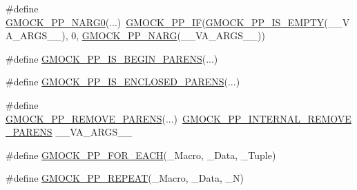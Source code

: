 \begin{DoxyCompactItemize}
\item 
\#define \mbox{\hyperlink{_obj__test_2lib_2googletest-master_2googlemock_2include_2gmock_2internal_2gmock-pp_8h_a0f49faf3c63534a722e2f320ff8d4cd0}{G\+M\+O\+C\+K\+\_\+\+P\+P\+\_\+\+N\+A\+R\+G0}}(...)~\mbox{\hyperlink{_obj__test_2lib_2googletest-master_2googlemock_2include_2gmock_2internal_2gmock-pp_8h_a82f153fedbaf56bf71b8272bdf672875}{G\+M\+O\+C\+K\+\_\+\+P\+P\+\_\+\+IF}}(\mbox{\hyperlink{_obj__test_2lib_2googletest-master_2googlemock_2include_2gmock_2internal_2gmock-pp_8h_a14eb10c5cc7380d072cd748661140f45}{G\+M\+O\+C\+K\+\_\+\+P\+P\+\_\+\+I\+S\+\_\+\+E\+M\+P\+TY}}(\+\_\+\+\_\+\+V\+A\+\_\+\+A\+R\+G\+S\+\_\+\+\_\+), 0, \mbox{\hyperlink{_obj__test_2lib_2googletest-master_2googlemock_2include_2gmock_2internal_2gmock-pp_8h_a9db18220b88597a07704bc7cf3b13304}{G\+M\+O\+C\+K\+\_\+\+P\+P\+\_\+\+N\+A\+RG}}(\+\_\+\+\_\+\+V\+A\+\_\+\+A\+R\+G\+S\+\_\+\+\_\+))
\item 
\#define \mbox{\hyperlink{_obj__test_2lib_2googletest-master_2googlemock_2include_2gmock_2internal_2gmock-pp_8h_a7b8ff4a4176413e60e3f46d14760182a}{G\+M\+O\+C\+K\+\_\+\+P\+P\+\_\+\+I\+S\+\_\+\+B\+E\+G\+I\+N\+\_\+\+P\+A\+R\+E\+NS}}(...)
\item 
\#define \mbox{\hyperlink{_obj__test_2lib_2googletest-master_2googlemock_2include_2gmock_2internal_2gmock-pp_8h_a10bbc38452431607a40619475c5248aa}{G\+M\+O\+C\+K\+\_\+\+P\+P\+\_\+\+I\+S\+\_\+\+E\+N\+C\+L\+O\+S\+E\+D\+\_\+\+P\+A\+R\+E\+NS}}(...)
\item 
\#define \mbox{\hyperlink{_obj__test_2lib_2googletest-master_2googlemock_2include_2gmock_2internal_2gmock-pp_8h_a56df0c468739cd6319be90b805a6d5b0}{G\+M\+O\+C\+K\+\_\+\+P\+P\+\_\+\+R\+E\+M\+O\+V\+E\+\_\+\+P\+A\+R\+E\+NS}}(...)~\mbox{\hyperlink{_obj__test_2lib_2googletest-master_2googlemock_2include_2gmock_2internal_2gmock-pp_8h_ac3c1fba05dad44080330c0ecd1208ca6}{G\+M\+O\+C\+K\+\_\+\+P\+P\+\_\+\+I\+N\+T\+E\+R\+N\+A\+L\+\_\+\+R\+E\+M\+O\+V\+E\+\_\+\+P\+A\+R\+E\+NS}} \+\_\+\+\_\+\+V\+A\+\_\+\+A\+R\+G\+S\+\_\+\+\_\+
\item 
\#define \mbox{\hyperlink{_obj__test_2lib_2googletest-master_2googlemock_2include_2gmock_2internal_2gmock-pp_8h_abc9368d9b0960531e3cfb9e5d6a41816}{G\+M\+O\+C\+K\+\_\+\+P\+P\+\_\+\+F\+O\+R\+\_\+\+E\+A\+CH}}(\+\_\+\+Macro,  \+\_\+\+Data,  \+\_\+\+Tuple)
\item 
\#define \mbox{\hyperlink{_obj__test_2lib_2googletest-master_2googlemock_2include_2gmock_2internal_2gmock-pp_8h_ab2a0d358d2eb3f04395d0494ab7aab01}{G\+M\+O\+C\+K\+\_\+\+P\+P\+\_\+\+R\+E\+P\+E\+AT}}(\+\_\+\+Macro,  \+\_\+\+Data,  \+\_\+N)

\end{DoxyCompactItemize}
